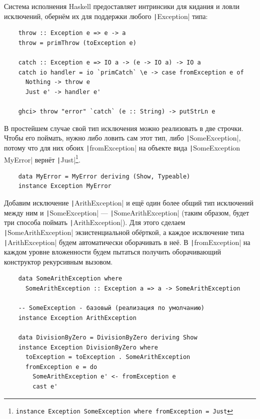 Система исполнения Haskell предоставляет интринсики для кидания и ловли исключений, обернём их для поддержки любого \texttt|Exception| типа:
\begin{verbatim}
    throw :: Exception e => e -> a
    throw = primThrow (toException e)

    catch :: Exception e => IO a -> (e -> IO a) -> IO a
    catch io handler = io `primCatch` \e -> case fromException e of
      Nothing -> throw e
      Just e' -> handler e'

    ghci> throw "error" `catch` (e :: String) -> putStrLn e
\end{verbatim}

В простейшем случае свой тип исключения можно реализовать в две строчки.
Чтобы его поймать, нужно либо ловить сам этот тип, либо \texttt|SomeException|, потому что для них обоих \texttt|fromException| на объекте вида \texttt|SomeException MyError| вернёт \texttt|Just|\footnote{\texttt{instance Exception SomeException where fromException = Just}}.
\begin{verbatim}
    data MyError = MyError deriving (Show, Typeable)
    instance Exception MyError
\end{verbatim}

Добавим исключение \texttt|ArithException| и ещё один более общий тип исключений между ним и \texttt|SomeException| --- \texttt|SomeArithException| (таким образом, будет три способа поймать \texttt|ArithException|).
Для этого сделаем \texttt|SomeArithException| экзистенциальной обёрткой, а каждое исключение типа \texttt|ArithException| будем автоматически оборачивать в неё.
В \texttt|fromException| на каждом уровне вложенности будем пытаться получить оборачивающий конструктор рекурсивным вызовом.

\begin{verbatim}
    data SomeArithException where
      SomeArithException :: Exception a => a -> SomeArithException

    -- SomeException - базовый (реализация по умолчанию)
    instance Exception ArithException

    data DivisionByZero = DivisionByZero deriving Show
    instance Exception DivisionByZero where
      toException = toException . SomeArithException
      fromException e = do
        SomeArithException e' <- fromException e
        cast e'
\end{verbatim}

